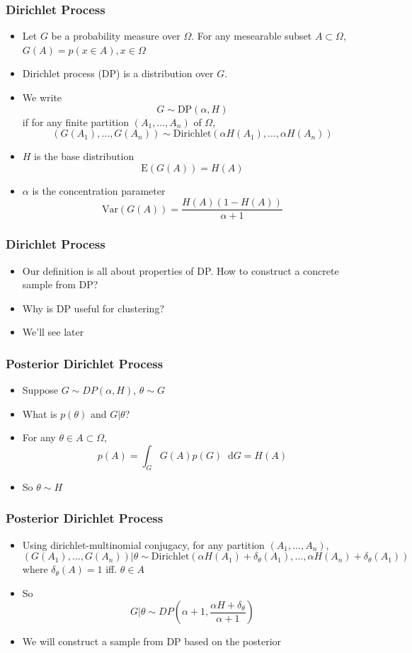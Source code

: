 \documentclass{beamer}
\newcommand*\diff{\mathop{}\!\mathrm{d}}
\begin{document}
\begin{frame}
	\frametitle{Dirichlet Process}
	\begin{itemize}
		\item Let $G$ be a probability measure over $\Omega$. For any mesearable subset $A\subset \Omega$, $G(A)=p(x\in A), x\in \Omega$
		\item Dirichlet process (DP) is a distribution over $G$. 
		\item We write 
		\[
			G \sim \text{DP}(\alpha, H)
		\]
		if for any finite partition $(A_1, \ldots, A_n)$ of $\Omega$,
		\[
			(G(A_1), \ldots, G(A_n)) \sim \text{Dirichlet}(\alpha H(A_1), \ldots, \alpha H(A_n))
		\]
		\item $H$ is the {\color{red} base distribution}
		\[
		\text{E}(G(A)) = H(A)
		\]
		\item $\alpha$ is the {\color{red} concentration parameter}
		\[
		\text{Var}(G(A)) = \frac{H(A)(1-H(A))}{\alpha+1}
		\]
	\end{itemize}
\end{frame}

\begin{frame}
	\frametitle{Dirichlet Process}
	\begin{itemize}
		\item{Our definition is all about properties of DP. How to construct a concrete sample from DP?}
		\item{Why is DP useful for clustering?}
		\item{We'll see later}
	\end{itemize}
\end{frame}

\begin{frame}
	\frametitle{Posterior Dirichlet Process}
	\begin{itemize}
		\item Suppose $G \sim DP(\alpha, H)$, $\theta \sim G$
		\item What is $p(\theta)$ and $G|\theta$?
		\pause
		\item For any $\theta \in A \subset \Omega$, \[
			p(A)=\int_G G(A)p(G)\diff G = H(A)
		\]
		\item So $\theta \sim H$
		
	\end{itemize}
\end{frame}

\begin{frame}
	\frametitle{Posterior Dirichlet Process}
	\begin{itemize}

		\item Using dirichlet-multinomial conjugacy, for any partition $(A_1, \ldots, A_n)$,
		\[
		(G(A_1), \ldots, G(A_n))|\theta \sim \text{Dirichlet}(\alpha H(A_1)+\delta_{\theta}(A_1), \ldots, \alpha H(A_n)+\delta_{\theta}(A_1))
		\]
		where $\delta_{\theta}(A)=1$ iff. $\theta \in A$
		\pause
		\item So 
		\[
		G|\theta \sim DP(\alpha+1, \frac{\alpha H + \delta_{\theta}}{\alpha+1})
		\]		
		\item We will construct a sample from DP based on the posterior
	\end{itemize}
\end{frame}
\end{document}

